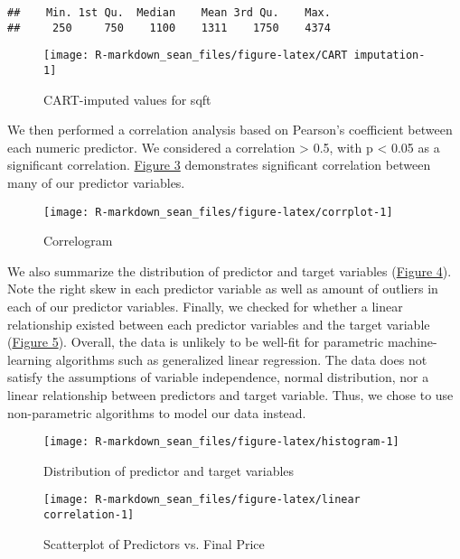 \documentclass[11pt,]{article}
\begin{document}
\begin{verbatim}
##    Min. 1st Qu.  Median    Mean 3rd Qu.    Max. 
##     250     750    1100    1311    1750    4374
\end{verbatim}

\begin{figure}

{\centering \texttt{[image: R-markdown\_sean\_files/figure-latex/CART imputation-1]} 

}

\caption{CART-imputed values for sqft\label{sec:fig2}}\label{fig:CART imputation}
\end{figure}

We then performed a correlation analysis based on Pearson's coefficient
between each numeric predictor. We considered a correlation
\textgreater{} 0.5, with p \textless{} 0.05 as a significant
correlation. \hyperref[sec:fig3]{Figure 3} demonstrates significant
correlation between many of our predictor variables.

\begin{figure}

{\centering \texttt{[image: R-markdown\_sean\_files/figure-latex/corrplot-1]} 

}

\caption{Correlogram\label{sec:fig3}}\label{fig:corrplot}
\end{figure}

We also summarize the distribution of predictor and target variables
(\hyperref[sec:fig4]{Figure 4}). Note the right skew in each predictor
variable as well as amount of outliers in each of our predictor
variables. Finally, we checked for whether a linear relationship existed
between each predictor variables and the target variable
(\hyperref[sec:fig5]{Figure 5}). Overall, the data is unlikely to be
well-fit for parametric machine-learning algorithms such as generalized
linear regression. The data does not satisfy the assumptions of variable
independence, normal distribution, nor a linear relationship between
predictors and target variable. Thus, we chose to use non-parametric
algorithms to model our data instead.

\begin{figure}

{\centering \texttt{[image: R-markdown\_sean\_files/figure-latex/histogram-1]} 

}

\caption{Distribution of predictor and target variables\label{sec:fig4}}\label{fig:histogram}
\end{figure}
\begin{figure}

{\centering \texttt{[image: R-markdown\_sean\_files/figure-latex/linear correlation-1]} 

}

\caption{Scatterplot of Predictors vs. Final Price\label{sec:fig5}}\label{fig:linear correlation}
\end{figure}
\end{document}
